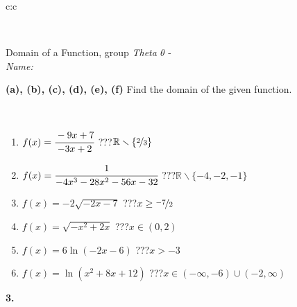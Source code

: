 \documentclass[10pt]{report}
\begin{document}
\begin{tabular}{c:c}
\begin{minipage}[c][104.5mm][t]{0.5\linewidth}
\begin{center}
\begin{minipage}{0.20\linewidth}
\end{minipage}
\end{center}
\end{minipage}
\\ \hdashline
\begin{minipage}[c][104.5mm][t]{0.5\linewidth}
\begin{center}
\vspace{7mm}
{\huge Domain of a Function, group \textit{Theta $\theta$} -}\\[5mm]
\textit{Name:}\phantom{xxxxxxxxxxxxxxxxxxxxxxxxxxxxxxxxxxxxxxxxxxxxxxxxxxxxxxxxxxxxxxxxx}\\[5mm]
\begin{minipage}{0.95\linewidth}
\begin{center}
{
\textbf{(a), (b), (c), (d), (e), (f)} Find the domain of the given function. \\[1mm]
\phantom{x}
}
\end{center}
\end{minipage}
\\[4mm]
\begin{minipage}{0.79\linewidth}
\begin{center}
\begin{varwidth}{\linewidth}
\begin{enumerate}
\normalsizerrr
\item $f(x)=\cfrac{-9x+7}{-3x+2}$\quad \dotfill\; ???\;\dotfill \quad $ \mathbb{R} \smallsetminus\{\nicefrac{2}{3} \}$
\item $f(x)=\cfrac{1}{-4x^3-28x^2-56x-32}$\quad \dotfill\; ???\;\dotfill \quad $ \mathbb{R} \smallsetminus\{-4,-2,-1 \}$
\item $f(x)=-2\sqrt{-2x-7}$\quad \dotfill\; ???\;\dotfill \quad $x\geq\nicefrac{-7}{2}$
\item $f(x)=\sqrt{-x^2+2x}$\quad \dotfill\; ???\;\dotfill \quad $x\in(0 , 2)$
\item $f(x)=6\ln{(-2x-6)}$\quad \dotfill\; ???\;\dotfill \quad $x>-3$
\item $f(x)=\ln{(x^2+8x+12)}$\quad \dotfill\; ???\;\dotfill \quad $x\in(-\infty , -6)\cup(-2 , \infty)$
\end{enumerate}
\end{varwidth}
\end{center}
\end{minipage}
\begin{minipage}{0.20\linewidth}
\begin{center}
{\Huge\bfseries 3.} \\[2mm]

\end{center}
\end{minipage}
\end{center}
\end{minipage}
\end{tabular}
\end{document}
